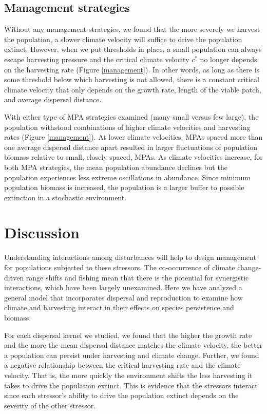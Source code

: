 \documentclass[12pt,english]{article}
\begin{document}
\begin{spacing}{1.9}
\begin{flushleft}
\subsection{Management strategies }

Without any management strategies, we found that the more severely we harvest the population, a slower climate velocity will suffice to drive the population extinct. However, when we put thresholds in place, a small population can always escape harvesting pressure and the critical climate velocity $c^*$ no longer depends on the harvesting rate (Figure \ref{management}). In other words, as long as there is some threshold below which harvesting is not allowed, there is a constant critical climate velocity that only depends on the growth rate, length of the viable patch, and average dispersal distance.  

With either type of MPA strategies examined (many small versus few large), the population withstood combinations of higher climate velocities and harvesting rates (Figure \ref{management}).  At lower climate velocities, MPAs spaced more than one average dispersal distance apart resulted in larger fluctuations of population biomass relative to small, closely spaced, MPAs.  As climate velocities increase, for both MPA strategies, the mean population abundance declines but the population experiences less extreme oscillations in abundance.  Since minimum population biomass is increased, the population is a larger buffer to possible extinction in a stochastic environment. 

\section{Discussion}

Understanding interactions among disturbances will help to design management for populations subjected to these stressors. The co-occurrence of climate change-driven range shifts and fishing mean that there is the potential for synergistic interactions, which have been largely unexamined.  Here we have analyzed
 a general model that incorporates dispersal and reproduction to examine how climate and harvesting interact in their effects on species persistence and biomass. 

For each dispersal kernel we studied, we found that the higher the growth rate and the more the mean dispersal distance matches the climate velocity, the better a population can persist under harvesting and climate change.  Further, we found a negative relationship between the critical harvesting rate and the climate velocity.  That is, the more quickly the environment shifts the less harvesting it takes to drive the population extinct.  This is evidence that the stressors interact since each stressor's ability to drive the population extinct depends on the severity of the other stressor. 


\end{flushleft}
\end{spacing}
\end{document}
